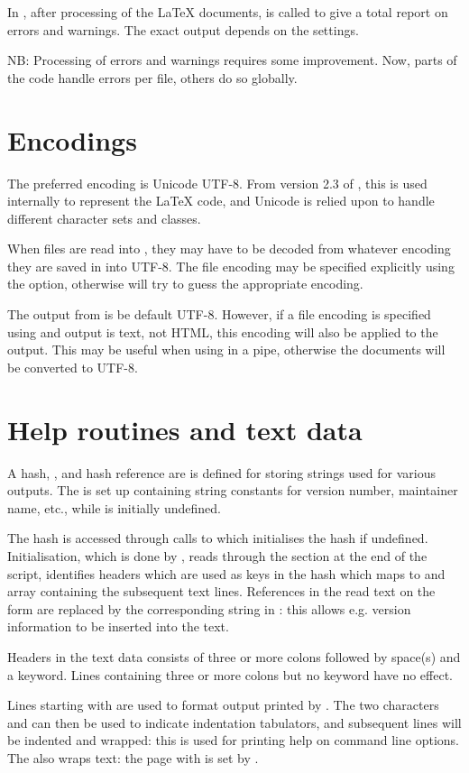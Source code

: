 \documentclass{article}
\begin{document}
In , after processing of the \LaTeX{} documents,  is called to give a total report on errors and warnings. The exact output depends on the settings. 

NB: Processing of errors and warnings requires some improvement. Now, parts of the code handle errors per file, others do so globally.



\section{Encodings}

The preferred encoding is Unicode UTF-8. From version 2.3 of \TeXcount{}, this is used internally to represent the \LaTeX{} code, and Unicode is relied upon to handle different character sets and classes.

When files are read into \TeXcount{}, they may have to be decoded from whatever encoding they are saved in into UTF-8. The file encoding may be specified explicitly using the  option, otherwise \TeXcount{} will try to guess the appropriate encoding.

The output from \TeXcount{} is be default UTF-8. However, if a file encoding is specified using  and output is text, not HTML, this encoding will also be applied to the output. This may be useful when using \TeXcount{} in a pipe, otherwise the documents will be converted to UTF-8.



\section{Help routines and text data}

A hash, , and hash reference  are is defined for storing strings used for various outputs. The  is set up containing string constants for version number, maintainer name, etc., while  is initially undefined.

The  hash is accessed through calls to  which initialises the hash if undefined. Initialisation, which is done by , reads through the  section at the end of the script, identifies headers which are used as keys in the hash which maps to and array containing the subsequent text lines. References in the read text on the form  are replaced by the corresponding string in : this allows e.g. version information to be inserted into the text.

Headers in the text data consists of three or more colons followed by space(s) and a keyword. Lines containing three or more colons but no keyword have no effect.

Lines starting with \code{\@} are used to format output printed by . The two characters  and  can then be used to indicate indentation tabulators, and subsequent lines will be indented and wrapped: this is used for printing help on command line options. The  also wraps text: the page with is set by .
\end{document}
